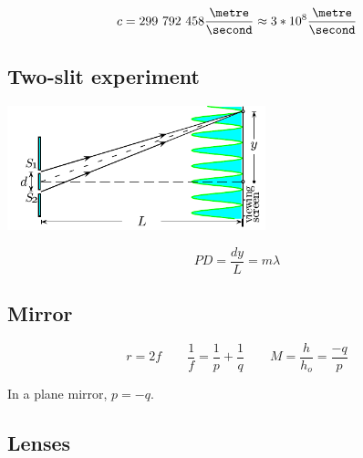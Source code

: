 \[
	c = 299\ 792\ 458 \frac{\metre}{\second} \approx 3 * 10^8 \frac{\metre}{\second}
\]

\subsection{Two-slit experiment}

\includegraphics[width=75mm]{content/soundlight/twoSlit}

\[
	PD = \frac{dy}{L} = m\lambda
\]

\subsection{Mirror}



\[
	r = 2f \qquad
	\frac{1}{f} = \frac{1}{p} + \frac{1}{q} \qquad
	M = \frac{h}{h_o} = \frac{-q}{p}
\]

In a plane mirror, $p = -q$.

\subsection{Lenses}

